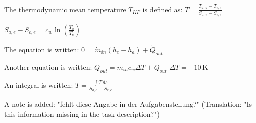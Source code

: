 The thermodynamic mean temperature \( T_{KF} \) is defined as:  
\( T = \frac{T_{a,a} - T_{e,e}}{S_{a,e} - S_{e,e}} \)  

\( S_{a,e} - S_{e,e} = c_{w} \ln \left( \frac{T_{a}}{T_{c}} \right) \)  

The equation is written:  
0 = \( \dot{m}_{in} (h_{e} - h_{a}) + \dot{Q}_{out} \)  

Another equation is written:  
\( \dot{Q}_{out} = \dot{m}_{in} c_{w} \Delta T + \dot{Q}_{out} \)  
\( \Delta T = -10 \, \text{K} \)  

An integral is written:  
\( T = \frac{\int T \, ds}{S_{a,e} - S_{e,e}} \)  

A note is added:  
"fehlt diese Angabe in der Aufgabenstellung?" (Translation: "Is this information missing in the task description?")